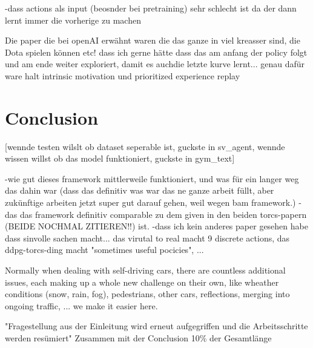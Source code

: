 -dass actions als input (beosnder bei pretraining) sehr schlecht ist da der dann lernt immer die vorherige zu machen

Die paper die bei openAI erwähnt waren die das ganze in viel kreasser sind, die Dota spielen können etc!
dass ich gerne hätte dass das am anfang der policy folgt und am ende weiter exploriert, damit es auchdie letzte kurve lernt... genau dafür ware halt intrinsic motivation und prioritized experience replay

\chapter{Conclusion}


[wennde testen wilslt ob dataset seperable ist, guckste in sv\_agent, wennde wissen willst ob das model funktioniert, guckste in gym\_text]


-wie gut dieses framework mittlerweile funktioniert, und was für ein langer weg das dahin war (dass das definitiv was war das ne ganze arbeit füllt, aber zukünftige arbeiten jetzt super gut darauf gehen, weil wegen bam framework.)
-das das framework definitiv comparable zu dem given in den beiden torcs-papern (BEIDE NOCHMAL ZITIEREN!!) ist.
-dass ich kein anderes paper gesehen habe dass sinvolle sachen macht... das virutal to real macht 9 discrete actions, das ddpg-torcs-ding macht "sometimes useful pocicies", ...

Normally when dealing with self-driving cars, there are countless additional issues, each making up a whole new challenge on their own, like wheather conditions (snow, rain, fog), pedestrians, other cars, reflections, merging into ongoing traffic, ...
we make it easier here.

"Fragestellung aus der Einleitung wird erneut aufgegriffen und die Arbeitsschritte
werden resümiert"
Zusammen mit der Conclusion 10\% der Gesamtlänge



